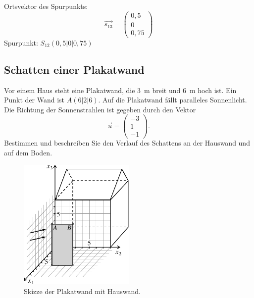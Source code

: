 \documentclass{ajc}
\numberwithin{equation}{subsection}
\begin{document}
	Ortsvektor des Spurpunkts: 
	\begin{equation}
		\overrightarrow{s_\text{13}}=\left(\begin{array}{r} 0,5 \\ 0 \\ 0,75\end{array}\right)
	\end{equation}
	Spurpunkt: $S_\text{12}(0,5|0|0,75)$
	
	\subsection{Schatten einer Plakatwand}
	Vor einem Haus steht eine Plakatwand, die \SI{3}{\m} breit und \SI{6}{m} hoch ist. Ein Punkt der Wand ist $A(6|2|6)$. Auf die Plakatwand fällt paralleles Sonnenlicht. Die Richtung der Sonnenstrahlen ist gegeben durch den Vektor
	\begin{equation*}
		\overrightarrow{u}=\left(\begin{array}{r} -3 \\ 1 \\ -1\end{array}\right).
	\end{equation*}
	Bestimmen und beschreiben Sie den Verlauf des Schattens an der Hauswand und auf dem Boden.
	
	\begin{figure}[ht]
		\centering
		\includegraphics[width=0.5\textwidth]{ma_001_schatten.pdf}
		\caption{Skizze der Plakatwand mit Hauswand.}
		\label{fig:001_schatten}
	\end{figure}
	
\end{document}
